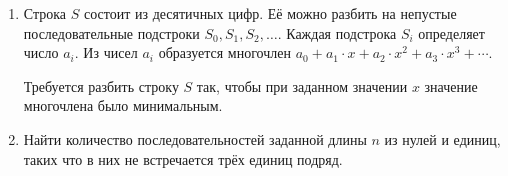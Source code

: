 \begin{enumerate}

\item Строка $S$ состоит из десятичных цифр. Её можно разбить на непустые последовательные
      подстроки $S_0, S_1, S_2, \ldots$. Каждая подстрока $S_i$ определяет число $a_i$. Из чисел
      $a_i$ образуется многочлен $a_0 + a_1\cdot x + a_2\cdot x^2 + a_3\cdot x^3 + \cdots$.
      
      Требуется разбить строку $S$ так, чтобы при заданном значении $x$ значение многочлена
      было минимальным.

\item Найти количество последовательностей заданной длины $n$ из нулей и единиц, таких что в них
      не встречается трёх единиц подряд.

\end{enumerate}

